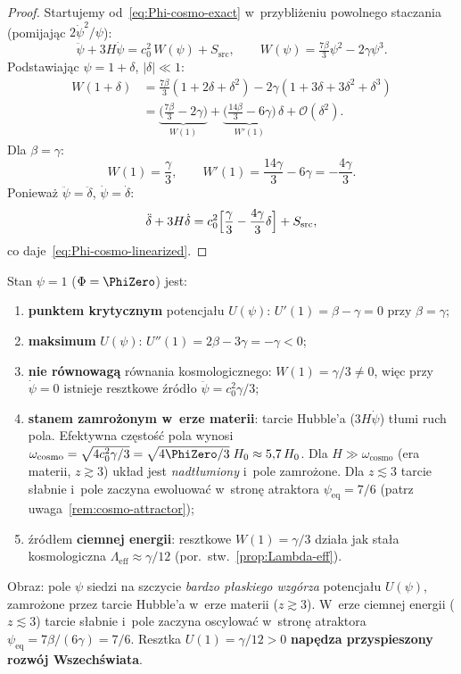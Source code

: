 \begin{proof}
Startujemy od~\eqref{eq:Phi-cosmo-exact} w~przybli\.zeniu
powolnego staczania (pomijaj\k{a}c $2\dot\psi^2/\psi$):
\[
  \ddot\psi + 3H\dot\psi
  = c_0^2\,W(\psi) + S_{\mathrm{src}},
  \qquad
  W(\psi) = \tfrac{7\beta}{3}\psi^2 - 2\gamma\psi^3.
\]
Podstawiaj\k{a}c $\psi = 1 + \delta$, $|\delta| \ll 1$:
\begin{align}
  W(1+\delta)
  &= \tfrac{7\beta}{3}(1+2\delta+\delta^2)
     - 2\gamma(1+3\delta+3\delta^2+\delta^3) \nonumber\\
  &= \underbrace{\bigl(\tfrac{7\beta}{3}-2\gamma\bigr)}_{W(1)}
     + \underbrace{\bigl(\tfrac{14\beta}{3}-6\gamma\bigr)}_{W'(1)}\,\delta
     + \mathcal{O}(\delta^2). \label{eq:W-expansion}
\end{align}
Dla $\beta = \gamma$:
\[
  W(1) = \frac{\gamma}{3}, \qquad
  W'(1) = \frac{14\gamma}{3} - 6\gamma = -\frac{4\gamma}{3}.
\]
Poniewa\.z $\ddot\psi = \ddot\delta$, $\dot\psi = \dot\delta$:
\[
  \ddot\delta + 3H\dot\delta
  = c_0^2\Bigl[\frac{\gamma}{3} - \frac{4\gamma}{3}\delta\Bigr]
  + S_{\mathrm{src}},
\]
co daje~\eqref{eq:Phi-cosmo-linearized}.
\end{proof}

\begin{remark}[Status $\psi = 1$: stan zamro\.zony, nie minimum]%
\label{rem:psi1-status}
Stan $\psi = 1$ ($\Phi = \PhiZero$) jest:
\begin{enumerate}[nosep]
  \item \textbf{punktem krytycznym} potencja\l{}u $U(\psi)$:
    $U'(1) = \beta - \gamma = 0$ przy $\beta = \gamma$;
  \item \textbf{maksimum} $U(\psi)$:
    $U''(1) = 2\beta - 3\gamma = -\gamma < 0$;
  \item \textbf{nie r\'ownowag\k{a}} r\'ownania kosmologicznego:
    $W(1) = \gamma/3 \neq 0$, wi\k{e}c przy $\dot\psi = 0$
    istnieje resztkowe \'zr\'od\l{}o $\ddot\psi = c_0^2\gamma/3$;
  \item \textbf{stanem zamro\.zonym w~erze materii}: tarcie Hubble'a ($3H\dot\psi$)
    t\l{}umi ruch pola. Efektywna cz\k{e}sto\'s\'c pola wynosi
    $\omega_{\mathrm{cosmo}} = \sqrt{4c_0^2\gamma/3}
    = \sqrt{4\PhiZero/3}\;H_0 \approx 5{,}7\,H_0$.
    Dla $H \gg \omega_{\mathrm{cosmo}}$ (era materii, $z \gtrsim 3$)
    uk\l{}ad jest \emph{nadt\l{}umiony} i~pole zamro\.zone.
    Dla $z \lesssim 3$ tarcie s\l{}abnie i~pole zaczyna
    ewoluowa\'c w~stron\k{e} atraktora $\psi_{\mathrm{eq}} = 7/6$
    (patrz uwaga~\ref{rem:cosmo-attractor});
  \item \'zr\'od\l{}em \textbf{ciemnej energii}: resztkowe
    $W(1) = \gamma/3$ dzia\l{}a jak sta\l{}a kosmologiczna
    $\Lambda_{\mathrm{eff}} \approx \gamma/12$ (por.\
    stw.~\ref{prop:Lambda-eff}).
\end{enumerate}
Obraz: pole $\psi$ siedzi na szczycie \emph{bardzo p\l{}askiego wzg\'orza}
potencja\l{}u $U(\psi)$, zamro\.zone przez tarcie Hubble'a
w~erze materii ($z \gtrsim 3$). W~erze ciemnej energii
($z \lesssim 3$) tarcie s\l{}abnie i~pole zaczyna oscylowa\'c
w~stron\k{e} atraktora $\psi_{\mathrm{eq}} = 7\beta/(6\gamma) = 7/6$.
Resztka $U(1) = \gamma/12 > 0$
\textbf{nap\k{e}dza przyspieszony rozw\'oj Wszech\'swiata}.
\end{remark}

